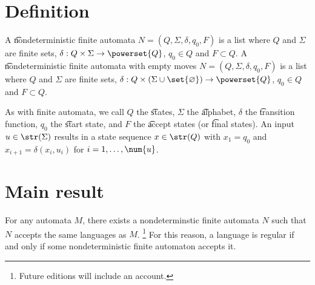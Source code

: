 
\section*{Definition}

A \t{nondeterministic finite automata} $N = (Q, \Sigma , \delta , q_0, F)$ is a list where $Q$ and $\Sigma $ are finite sets, $\delta : Q \times \Sigma  \to \powerset{Q}$, $q_0 \in Q$ and $F \subset Q$.
A \t{nondeterministic finite automata with empty moves} $N = (Q, \Sigma , \delta , q_0, F)$ is a list where $Q$ and $\Sigma $ are finite sets, $\delta : Q \times (\Sigma  \cup \set{\varnothing}) \to \powerset{Q}$, $q_0 \in Q$ and $F \subset Q$.

As with finite automata, we call $Q$ the \t{states}, $\Sigma $ the \t{alphabet}, $\delta $ the \t{transition function}, $q_0$ the \t{start state}, and $F$ the \t{accept states} (or \t{final states}).
An input $u \in \str(\Sigma )$ results in a state sequence $x \in \str(Q)$ with $x_1 = q_0$ and $x_{i+1} = \delta (x_i, u_i)$ for $i = 1, \dots , \num{u}$.

\section*{Main result}

For any automata $M$, there exists a nondeterminstic finite automata $N$ such that $N$ accepts the same languages as $M$.
  \ifhmode\unskip\fi\footnote{
Future editions will include an account.
  }
For this reason, a language is regular if and only if some nondeterministic finite automaton accepts it.

\blankpage